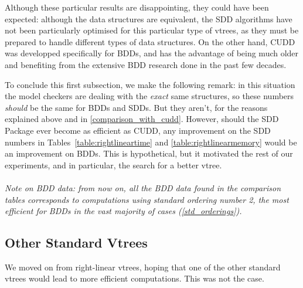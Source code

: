 \documentclass[11pt]{report}
\begin{document}
Although these particular results are disappointing, they could have been expected: although the data structures are equivalent, the SDD algorithms have not been particularly optimised for this particular type of vtrees, as they must be prepared to handle different types of data structures. On the other hand, CUDD was developped specifically for BDDs, and has the advantage of being much older and benefiting from the extensive BDD research done in the past few decades.  

To conclude this first subsection, we make the following remark: in this situation the model checkers are dealing with the \textit{exact} same structures, so these numbers \textit{should }be the same for BDDs and SDDs. But they aren't, for the reasons explained above and in \ref{comparison_with_cudd}. However, should the SDD Package ever become as efficient as CUDD, any improvement on the SDD numbers in Tables~\ref{table:rightlineartime} and \ref{table:rightlinearmemory} would be an improvement on BDDs. This is hypothetical, but it motivated the rest of our experiments, and in particular, the search for a better vtree.
\\\\
\textit{Note on BDD data: from now on, all the BDD data found in the comparison tables corresponds to computations using standard ordering number 2, the most efficient for BDDs in the vast majority of cases (\ref{std_orderings}).
}

\subsection{Other Standard Vtrees}

We moved on from right-linear vtrees, hoping that one of the other standard vtrees would lead to more efficient computations. This was not the case. 
\end{document}

